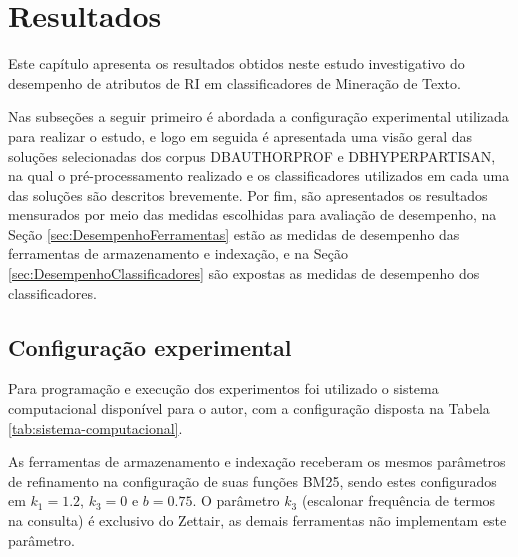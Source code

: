 \chapter{Resultados} \label{ch:Resultados}



	Este capítulo apresenta os resultados obtidos neste estudo investigativo do desempenho de atributos de RI em classificadores de Mineração de Texto.

	Nas subseções a seguir primeiro é abordada a configuração experimental utilizada para realizar o estudo, e logo em seguida é apresentada uma visão geral das soluções selecionadas dos corpus DB\underscore{}AUTHORPROF e DB\underscore{}HYPERPARTISAN, na qual o pré-processamento realizado e os classificadores utilizados em cada uma das soluções são descritos brevemente.
	Por fim, são apresentados os resultados mensurados por meio das medidas escolhidas para avaliação de desempenho, na Seção \ref{sec:DesempenhoFerramentas} estão as medidas de desempenho das ferramentas de armazenamento e indexação, e na Seção \ref{sec:DesempenhoClassificadores} são expostas as medidas de desempenho dos classificadores.


	\section{Configuração experimental} \label{sec:ConfiguraçãoExperimental}

		Para programação e execução dos experimentos foi utilizado o sistema computacional disponível para o autor, com a configuração disposta na Tabela \ref{tab:sistema-computacional}.

		
		
		As ferramentas de armazenamento e indexação receberam os mesmos parâmetros de refinamento na configuração de suas funções BM25, sendo estes configurados em $k_1 = 1.2$, $k_3 = 0$ e $b = 0.75$.
		O parâmetro $k_3$ (escalonar frequência de termos na consulta) é exclusivo do Zettair, as demais ferramentas não implementam este parâmetro.

